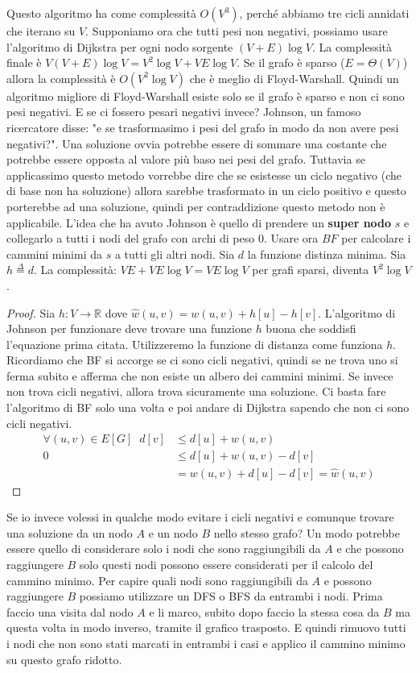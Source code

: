 \documentclass[a4paper]{article}
\begin{document}
\noindent
Questo algoritmo ha come complessità $O(V^3)$, perché abbiamo tre cicli annidati che iterano su $V$.
Supponiamo ora che tutti pesi non negativi, possiamo usare l'algoritmo di Dijkstra per ogni nodo sorgente $(V+E)\log{V}$.
La complessità finale è $V(V+E)\log{V} = V^2\log{V} + VE\log{V}$. 
Se il grafo è sparso ($E = \Theta(V)$) allora la complessità è $O(V^2\log{V})$ che è meglio di Floyd-Warshall.
Quindi un algoritmo migliore di Floyd-Warshall esiste solo se il grafo è sparso e non ci sono pesi negativi.
E se ci fossero pesari negativi invece? Johnson, un famoso ricercatore disse: "e se trasformasimo i pesi del grafo in modo da non avere pesi negativi?".
Una soluzione ovvia potrebbe essere di sommare una costante che potrebbe essere opposta al valore più baso nei pesi del grafo.
Tuttavia se applicassimo questo metodo vorrebbe dire che se esistesse un ciclo negativo (che di base non ha soluzione) allora 
sarebbe trasformato in un ciclo positivo e questo porterebbe ad una soluzione, quindi per contraddizione questo metodo non è applicabile.
L'idea che ha avuto Johnson è quello di prendere un \textbf{super nodo} $s$ e collegarlo a tutti i nodi del grafo con archi di peso $0$.
Usare ora $BF$ per calcolare i cammini minimi da $s$ a tutti gli altri nodi.
Sia $d$ la funzione distinza minima. Sia $h \stackrel{\Delta}{=} d$. 
La complessità: $VE + VE\log{V} = VE\log{V}$ per grafi sparsi, diventa $V^2\log{V}$. 
\begin{proof}
  Sia $h : V \rightarrow \mathbb{R}$ dove $\hat{w}(u,v) = w(u,v) + h[u] - h[v]$.
  L'algoritmo di Johnson per funzionare deve trovare una funzione $h$ buona che soddisfi l'equazione prima citata. Utilizzeremo la funzione di distanza come funziona $h$.
  Ricordiamo che BF si accorge se ci sono cicli negativi, quindi se ne trova uno si ferma subito e afferma che non esiste un albero dei cammini minimi.
  Se invece non trova cicli negativi, allora trova sicuramente una soluzione. Ci basta fare l'algoritmo di BF solo una volta e poi andare di Dijkstra sapendo
  che non ci sono cicli negativi.
  \[
  \begin{aligned}
    \forall (u,v) \in E[G] \; \; d[v] &\le d[u] + w(u,v)\\
    0 &\le d[u] + w(u,v) - d[v]\\
    &= w(u,v) + d[u]- d[v] =  \hat{w}(u,v)
  \end{aligned}
  \]
\end{proof}
\noindent
Se io invece volessi in qualche modo evitare i cicli negativi e comunque trovare una soluzione da un nodo $A$ e un nodo $B$ nello stesso grafo?
Un modo potrebbe essere quello di considerare solo i nodi che sono raggiungibili da $A$ e che possono raggiungere $B$ solo questi nodi possono essere considerati per il calcolo del cammino minimo.
Per capire quali nodi sono raggiungibili da $A$ e possono raggiungere $B$ possiamo utilizzare un DFS o BFS da entrambi i nodi.
Prima faccio una visita dal nodo $A$ e li marco, subito dopo faccio la stessa cosa da $B$ ma questa volta in modo inverso, tramite il grafico trasposto.
E quindi rimuovo tutti i nodi che non sono stati marcati in entrambi i casi e applico il cammino minimo su questo grafo ridotto.
\end{document}
